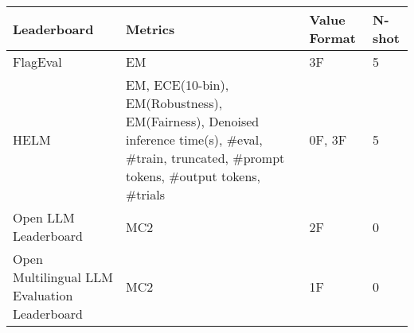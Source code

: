 \begin{tabular}{llll}
\toprule
Leaderboard & Metrics & Value Format & N-shot \\
\midrule
FlagEval & EM & 3F & 5 \\
HELM & EM, ECE(10-bin), EM(Robustness), EM(Fairness), Denoised inference time(s), \#eval, \#train, truncated, \#prompt tokens, \#output tokens, \#trials & 0F, 3F & 5 \\
Open LLM Leaderboard & MC2 & 2F & 0 \\
Open Multilingual LLM Evaluation Leaderboard & MC2 & 1F & 0 \\
\bottomrule
\end{tabular}
